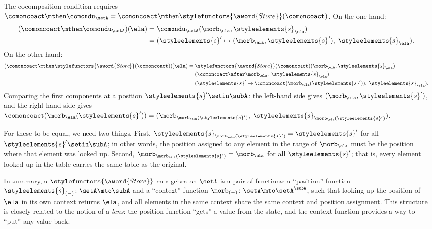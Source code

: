 \begin{example}
The cocomposition condition requires $\comoncoact \mthen \comondu_\setA = \comoncoact \mthen \stylefunctors{\aword{Store}}(\comoncoact)$. On the one hand:
\begin{align*}
(\comoncoact \mthen \comondu_\setA)(\ela)
& = \comondu_\setA(\morb_\ela, \styleelements{s}_\ela) \\
& = (\styleelements{s}' \mapsto (\morb_\ela, \styleelements{s}'),\; \styleelements{s}_\ela).
\end{align*}
On the other hand:
\begin{align*}
(\comoncoact \mthen \stylefunctors{\aword{Store}}(\comoncoact))(\ela)
& = \stylefunctors{\aword{Store}}(\comoncoact)(\morb_\ela, \styleelements{s}_\ela) \\
& = (\comoncoact \after \morb_\ela,\; \styleelements{s}_\ela) \\
& = (\styleelements{s}' \mapsto \comoncoact(\morb_\ela(\styleelements{s}')),\; \styleelements{s}_\ela).
\end{align*}
Comparing the first components at a position $\styleelements{s}' \setin \subA$: the left-hand side gives $(\morb_\ela, \styleelements{s}')$, and the right-hand side gives $\comoncoact(\morb_\ela(\styleelements{s}')) = (\morb_{\morb_\ela(\styleelements{s}')},\; \styleelements{s}_{\morb_\ela(\styleelements{s}')})$.

For these to be equal, we need two things. First, $\styleelements{s}_{\morb_\ela(\styleelements{s}')} = \styleelements{s}'$ for all $\styleelements{s}' \setin \subA$; in other words, the position assigned to any element in the range of $\morb_\ela$ must be the position where that element was looked up. Second, $\morb_{\morb_\ela(\styleelements{s}')} = \morb_\ela$ for all $\styleelements{s}'$; that is, every element looked up in the table carries the same table as the original.

In summary, a $\stylefunctors{\aword{Store}}$-co-algebra on $\setA$ is a pair of functions: a ``position'' function $\styleelements{s}_{(-)} \colon \setA \mto \subA$ and a ``context'' function $\morb_{(-)} \colon \setA \mto \setA^{\subA}$, such that looking up the position of $\ela$ in its own context returns $\ela$, and all elements in the same context share the same context and position assignment. This structure is closely related to the notion of a \emph{lens}: the position function ``gets'' a value from the state, and the context function provides a way to ``put'' any value back.
\end{example}


